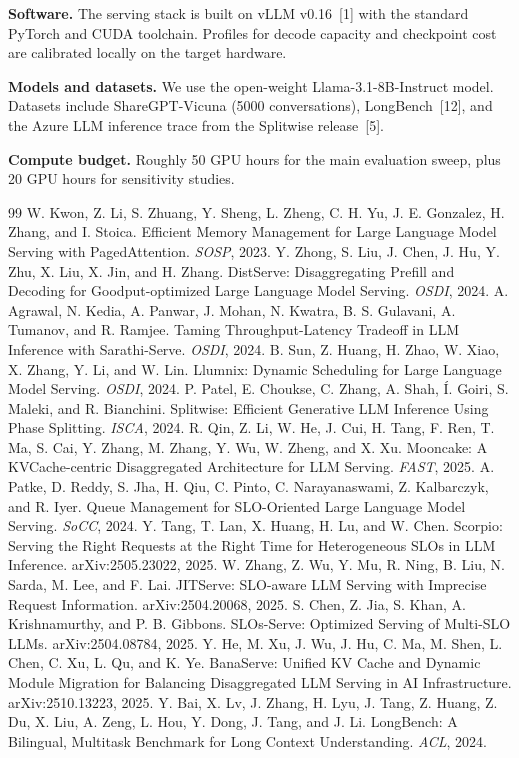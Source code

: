 \documentclass{article}
\begin{document}
\textbf{Software.} The serving stack is built on vLLM v0.16~[1] with the standard PyTorch and CUDA toolchain. Profiles for decode capacity and checkpoint cost are calibrated locally on the target hardware.

\textbf{Models and datasets.} We use the open-weight Llama-3.1-8B-Instruct model. Datasets include ShareGPT-Vicuna (5000 conversations), LongBench~[12], and the Azure LLM inference trace from the Splitwise release~[5].

\textbf{Compute budget.} Roughly 50 GPU hours for the main evaluation sweep, plus 20 GPU hours for sensitivity studies.

\begin{thebibliography}{99}
 W. Kwon, Z. Li, S. Zhuang, Y. Sheng, L. Zheng, C. H. Yu, J. E. Gonzalez, H. Zhang, and I. Stoica. Efficient Memory Management for Large Language Model Serving with PagedAttention. \emph{SOSP}, 2023.
 Y. Zhong, S. Liu, J. Chen, J. Hu, Y. Zhu, X. Liu, X. Jin, and H. Zhang. DistServe: Disaggregating Prefill and Decoding for Goodput-optimized Large Language Model Serving. \emph{OSDI}, 2024.
 A. Agrawal, N. Kedia, A. Panwar, J. Mohan, N. Kwatra, B. S. Gulavani, A. Tumanov, and R. Ramjee. Taming Throughput-Latency Tradeoff in LLM Inference with Sarathi-Serve. \emph{OSDI}, 2024.
 B. Sun, Z. Huang, H. Zhao, W. Xiao, X. Zhang, Y. Li, and W. Lin. Llumnix: Dynamic Scheduling for Large Language Model Serving. \emph{OSDI}, 2024.
 P. Patel, E. Choukse, C. Zhang, A. Shah, \'I. Goiri, S. Maleki, and R. Bianchini. Splitwise: Efficient Generative LLM Inference Using Phase Splitting. \emph{ISCA}, 2024.
 R. Qin, Z. Li, W. He, J. Cui, H. Tang, F. Ren, T. Ma, S. Cai, Y. Zhang, M. Zhang, Y. Wu, W. Zheng, and X. Xu. Mooncake: A KVCache-centric Disaggregated Architecture for LLM Serving. \emph{FAST}, 2025.
 A. Patke, D. Reddy, S. Jha, H. Qiu, C. Pinto, C. Narayanaswami, Z. Kalbarczyk, and R. Iyer. Queue Management for SLO-Oriented Large Language Model Serving. \emph{SoCC}, 2024.
 Y. Tang, T. Lan, X. Huang, H. Lu, and W. Chen. Scorpio: Serving the Right Requests at the Right Time for Heterogeneous SLOs in LLM Inference. arXiv:2505.23022, 2025.
 W. Zhang, Z. Wu, Y. Mu, R. Ning, B. Liu, N. Sarda, M. Lee, and F. Lai. JITServe: SLO-aware LLM Serving with Imprecise Request Information. arXiv:2504.20068, 2025.
 S. Chen, Z. Jia, S. Khan, A. Krishnamurthy, and P. B. Gibbons. SLOs-Serve: Optimized Serving of Multi-SLO LLMs. arXiv:2504.08784, 2025.
 Y. He, M. Xu, J. Wu, J. Hu, C. Ma, M. Shen, L. Chen, C. Xu, L. Qu, and K. Ye. BanaServe: Unified KV Cache and Dynamic Module Migration for Balancing Disaggregated LLM Serving in AI Infrastructure. arXiv:2510.13223, 2025.
 Y. Bai, X. Lv, J. Zhang, H. Lyu, J. Tang, Z. Huang, Z. Du, X. Liu, A. Zeng, L. Hou, Y. Dong, J. Tang, and J. Li. LongBench: A Bilingual, Multitask Benchmark for Long Context Understanding. \emph{ACL}, 2024.
\end{thebibliography}
\end{document}
